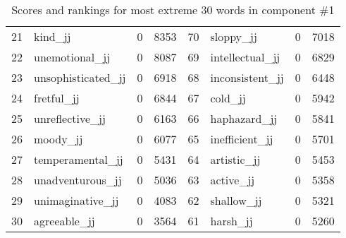 \begin{table}[tbp]
\begin{tabular}{| rlr@{.}l | rlr@{.}l |}
    21 & kind\_jj & 0 & 8353    &    70 & sloppy\_jj & 0 & 7018 \\
    22 & unemotional\_jj & 0 & 8087    &    69 & intellectual\_jj & 0 & 6829 \\
    23 & unsophisticated\_jj & 0 & 6918    &    68 & inconsistent\_jj & 0 & 6448 \\
    24 & fretful\_jj & 0 & 6844    &    67 & cold\_jj & 0 & 5942 \\
    25 & unreflective\_jj & 0 & 6163    &    66 & haphazard\_jj & 0 & 5841 \\
    26 & moody\_jj & 0 & 6077    &    65 & inefficient\_jj & 0 & 5701 \\
    27 & temperamental\_jj & 0 & 5431    &    64 & artistic\_jj & 0 & 5453 \\
    28 & unadventurous\_jj & 0 & 5036    &    63 & active\_jj & 0 & 5358 \\
    29 & unimaginative\_jj & 0 & 4083    &    62 & shallow\_jj & 0 & 5321 \\
    30 & agreeable\_jj & 0 & 3564    &    61 & harsh\_jj & 0 & 5260 \\
    \hline
    \end{tabular}
    \caption{Scores and rankings for most extreme 30 words in component \#1} 
\end{table}
\clearpage
